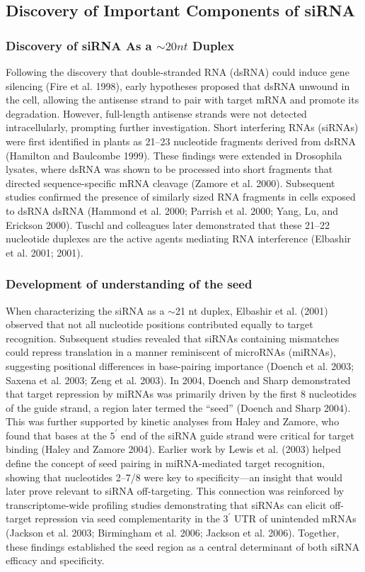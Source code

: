 \documentclass{report}
\begin{document}
\subsection{Discovery of Important Components of siRNA}
\subsubsection{Discovery of siRNA As a $\sim20nt$ Duplex}

Following the discovery that double-stranded RNA (dsRNA) could induce gene silencing (Fire et al. 1998), early hypotheses proposed that dsRNA unwound in the cell, allowing the antisense strand to pair with target mRNA and promote its degradation. However, full-length antisense strands were not detected intracellularly, prompting further investigation. Short interfering RNAs (siRNAs) were first identified in plants as 21–23 nucleotide fragments derived from dsRNA (Hamilton and Baulcombe 1999). These findings were extended in Drosophila lysates, where dsRNA was shown to be processed into short fragments that directed sequence-specific mRNA cleavage (Zamore et al. 2000). Subsequent studies confirmed the presence of similarly sized RNA fragments in cells exposed to dsRNA dsRNA (Hammond et al. 2000; Parrish et al. 2000; Yang, Lu, and Erickson 2000). Tuschl and colleagues later demonstrated that these 21–22 nucleotide duplexes are the active agents mediating RNA interference (Elbashir et al. 2001; 2001).


\subsubsection{Development of understanding of the seed}

When characterizing the siRNA as a $\sim$21 nt duplex, Elbashir et al. (2001) observed that not all nucleotide positions contributed equally to target recognition. Subsequent studies revealed that siRNAs containing mismatches could repress translation in a manner reminiscent of microRNAs (miRNAs), suggesting positional differences in base-pairing importance (Doench et al. 2003; Saxena et al. 2003; Zeng et al. 2003). In 2004, Doench and Sharp demonstrated that target repression by miRNAs was primarily driven by the first 8 nucleotides of the guide strand, a region later termed the “seed” (Doench and Sharp 2004). This was further supported by kinetic analyses from Haley and Zamore, who found that bases at the $5^\prime$ end of the siRNA guide strand were critical for target binding (Haley and Zamore 2004). Earlier work by Lewis et al. (2003) helped define the concept of seed pairing in miRNA-mediated target recognition, showing that nucleotides 2–7/8 were key to specificity—an insight that would later prove relevant to siRNA off-targeting. This connection was reinforced by transcriptome-wide profiling studies demonstrating that siRNAs can elicit off-target repression via seed complementarity in the $3^\prime$ UTR of unintended mRNAs (Jackson et al. 2003; Birmingham et al. 2006; Jackson et al. 2006). Together, these findings established the seed region as a central determinant of both siRNA efficacy and specificity. 
\end{document}
